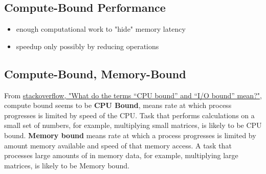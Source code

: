 \documentclass[10pt]{amsart}
\begin{document}
\begin{multicols*}{2}
\subsection{Compute-Bound Performance}
\begin{itemize}
	\item enough computational work to "hide" memory latency 
	\item speedup only possibly by reducing operations
\end{itemize}
\subsection{Compute-Bound, Memory-Bound}
From \href{https://stackoverflow.com/questions/868568/what-do-the-terms-cpu-bound-and-i-o-bound-mean}{stackoverflow, "What do the terms “CPU bound” and “I/O bound” mean?"}, compute bound seems to be \textbf{CPU Bound}, means rate at which process progresses is limited by speed of the CPU.  Task that performs calculations on a small set of numbers, for example, multiplying small matrices, is likely to be CPU bound.  
\textbf{Memory bound} means rate at which a process progresses is limited by amount memory available and speed of that memory access.  A task that processes large amounts of in memory data, for example, multiplying large matrices, is likely to be Memory bound.  

\end{multicols*}
\end{document}
